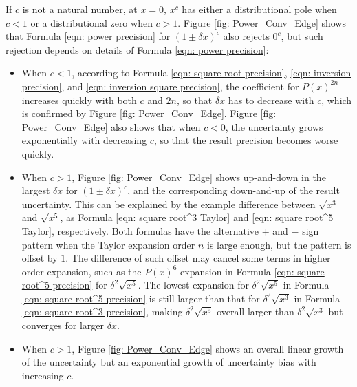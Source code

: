\documentclass[twoside]{article}
\numberwithin{equation}{section}
\begin{document}
If $c$ is not a natural number, at $x = 0$, $x^c$ has either a distributional pole when $c < 1$ or a distributional zero when $c > 1$.
Figure \ref{fig: Power_Conv_Edge} shows that Formula \eqref{eqn: power precision} for $(1 \pm \delta x)^c$ also rejects $0^c$, but such rejection depends on details of Formula \eqref{eqn: power precision}:
\begin{itemize}
\item 
When $c < 1$, according to Formula \eqref{eqn: square root precision}, \eqref{eqn: inversion precision}, and \eqref{eqn: inversion square precision}, the coefficient for $P(x)^{2n}$ increases quickly with both $c$ and $2n$, so that $\delta x$ has to decrease with $c$, which is confirmed by Figure \ref{fig: Power_Conv_Edge}.
Figure \ref{fig: Power_Conv_Edge} also shows that  when $c < 0$, the uncertainty grows exponentially with decreasing $c$, so that the result precision becomes worse quickly.

\item
When $c > 1$,  Figure \ref{fig: Power_Conv_Edge} shows up-and-down in the largest $\delta x$ for $(1 \pm \delta x)^c$, and the corresponding down-and-up of the result uncertainty.
This can be explained by the example difference between $\sqrt{x^3}$ and $\sqrt{x^5}$, as Formula \eqref{eqn: square root^3 Taylor} and \eqref{eqn: square root^5 Taylor}, respectively.
Both formulas have the alternative $+$ and $-$ sign pattern when the Taylor expansion order $n$ is large enough, but the pattern is offset by $1$.
The difference of such offset may cancel some terms in higher order expansion, such as the $P(x)^6$ expansion in Formula \eqref{eqn: square root^5 precision} for $\delta^2 \sqrt{x^5}$.
The lowest expansion for $\delta^2 \sqrt{x^5}$  in Formula \eqref{eqn: square root^5 precision} is still larger than that for $\delta^2 \sqrt{x^3}$  in Formula \eqref{eqn: square root^3 precision}, making $\delta^2 \sqrt{x^5}$ overall larger than $\delta^2 \sqrt{x^3}$ but converges for larger $\delta x$.

\item 
When $c > 1$,  Figure \ref{fig: Power_Conv_Edge} shows an overall linear growth of the uncertainty but an exponential growth of uncertainty bias with increasing $c$.

\end{itemize}
\end{document}
